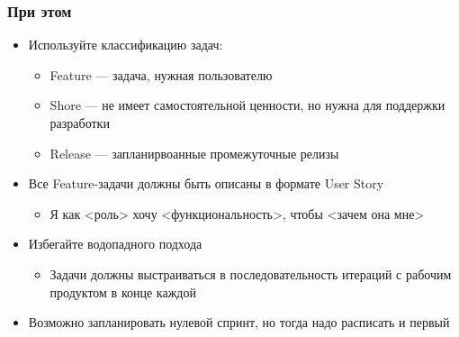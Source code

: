 \documentclass[xetex,mathserif,serif]{beamer}
\begin{document}
	\begin{frame}
		\frametitle{При этом}
		\begin{itemize}
			\item Используйте классификацию задач:
			\begin{itemize}
				\item Feature --- задача, нужная пользователю
				\item Shore --- не имеет самостоятельной ценности, но нужна для поддержки разработки
				\item Release --- запланирвоанные промежуточные релизы
			\end{itemize}
			\item Все Feature-задачи должны быть описаны в формате User Story
			\begin{itemize}
				\item Я как <роль> хочу <функциональность>, чтобы <зачем она мне>
			\end{itemize}
			\item Избегайте водопадного подхода
			\begin{itemize}
				\item Задачи должны выстраиваться в последовательность итераций с рабочим продуктом в конце каждой
			\end{itemize}
			\item Возможно запланировать нулевой спринт, но тогда надо расписать и первый
		\end{itemize}
	\end{frame}
\end{document}
